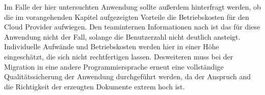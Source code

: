 Im Falle der hier untersuchten Anwendung sollte außerdem hinterfragt werden, ob die im vorangehenden Kapitel aufgezeigten Vorteile die Betriebskosten für den Cloud Provider aufwiegen. Den teaminternen Informationen nach ist das für diese Anwendung nicht der Fall, solange die Benutzerzahl nicht deutlich ansteigt. Individuelle Aufwände und Betriebskosten werden hier in einer Höhe eingeschätzt, die sich nicht rechtfertigen lassen. Desweiteren muss bei der Migration in eine andere Programmiersprache erneut eine vollständige Qualitätssicherung der Anwendung durchgeführt werden, da der Anspruch and die Richtigkeit der erzeugten Dokumente extrem hoch ist.
\pagebreak
